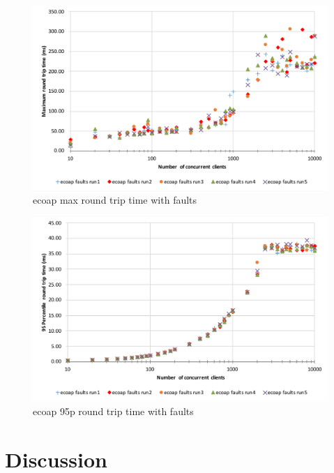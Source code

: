 \begin{figure}[!htbp]
\centering
\includegraphics[scale = 0.8]{ecoap_max_round_trip_time_faults}
\caption{ecoap max round trip time with faults}
\label{fig:ecoap_max_round_trip_time_faults}
\end{figure}

\begin{figure}[!htbp]
\centering
\includegraphics[scale = 0.8]{ecoap_95p_round_trip_time_faults}
\caption{ecoap 95p round trip time with faults}
\label{fig:ecoap_95p_round_trip_time_faults}
\end{figure}

\section{Discussion}